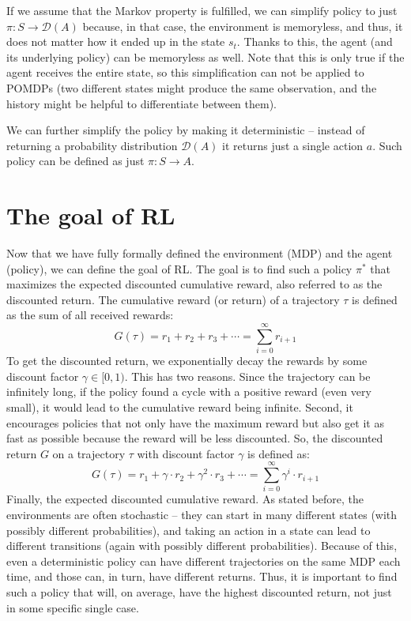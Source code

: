 \documentclass[
  digital,     %
  oneside,     %
  nosansbold,  %
  nocolorbold, %
  lof,         %
  lot,         %
]{fithesis4}
\begin{document}
If we assume that the Markov property is fulfilled, we can simplify policy to just $\pi\colon S \to \mathcal{D}(A)$ because, in that case, the environment is memoryless, and thus, it does not matter how it ended up in the state $s_t$. Thanks to this, the agent (and its underlying policy) can be memoryless as well. Note that this is only true if the agent receives the entire state, so this simplification can not be applied to POMDPs (two different states might produce the same observation, and the history might be helpful to differentiate between them).

We can further simplify the policy by making it deterministic -- instead of returning a probability distribution $\mathcal{D}(A)$ it returns just a single action $a$. Such policy can be defined as just $\pi\colon S \to A$.

\section{The goal of RL}
\label{sec:goal}
Now that we have fully formally defined the environment (MDP) and the agent (policy), we can define the goal of RL. The goal is to find such a policy $\pi^*$ that maximizes the expected discounted cumulative reward, also referred to as the discounted return. The cumulative reward (or return) of a trajectory $\tau$ is defined as the sum of all received rewards:
\begin{equation}
G(\tau) = r_1+r_2+r_3+\dotsb = \sum_{i=0}^{\infty} r_{i+1}
\end{equation}
To get the discounted return, we exponentially decay the rewards by some discount factor $\gamma \in [0,1)$. This has two reasons. Since the trajectory can be infinitely long, if the policy found a cycle with a positive reward (even very small), it would lead to the cumulative reward being infinite. Second, it encourages policies that not only have the maximum reward but also get it as fast as possible because the reward will be less discounted. So, the discounted return $G$ on a trajectory $\tau$ with discount factor $\gamma$ is defined as:
\begin{equation}
G(\tau)=r_1+\gamma \cdot r_2+ \gamma^2 \cdot r_3+\dotsb = \sum_{i=0}^{\infty} \gamma^i\cdot r_{i+1}
\end{equation}
Finally, the expected discounted cumulative reward. As stated before, the environments are often stochastic -- they can start in many different states (with possibly different probabilities), and taking an action in a state can lead to different transitions (again with possibly different probabilities). Because of this, even a deterministic policy can have different trajectories on the same MDP each time, and those can, in turn, have different returns. Thus, it is important to find such a policy that will, on average, have the highest discounted return, not just in some specific single case.
\end{document}
